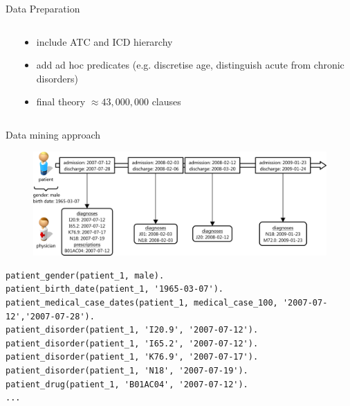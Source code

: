 \message{ !name(presentation.tex)}\documentclass{beamer}
\begin{document}
\begin{frame}{Data Preparation}
\begin{columns}
\begin{column}{.3\textwidth}
\end{column}%
\hfill%
\begin{column}{.66\textwidth}
  \begin{itemize}
  \item include ATC and ICD hierarchy
  \item add ad hoc predicates (e.g. discretise age, distinguish acute from chronic disorders)
  \item final theory $\approx 43,000,000$ clauses
  \end{itemize}
\end{column}%
\end{columns}

\end{frame}

\begin{frame}[fragile]{Data mining approach}
 \begin{minipage}{\textwidth}
\begin{figure}
\includegraphics[width=\textwidth,keepaspectratio]{timeline_final2}
\end{figure}
  \end{minipage}
  \vfill
  \begin{minipage}{\textwidth}
    \centering
{\tiny
\begin{verbatim}
patient_gender(patient_1, male).
patient_birth_date(patient_1, '1965-03-07').
patient_medical_case_dates(patient_1, medical_case_100, '2007-07-12','2007-07-28').
patient_disorder(patient_1, 'I20.9', '2007-07-12').
patient_disorder(patient_1, 'I65.2', '2007-07-12').
patient_disorder(patient_1, 'K76.9', '2007-07-17').
patient_disorder(patient_1, 'N18', '2007-07-19').
patient_drug(patient_1, 'B01AC04', '2007-07-12').
...
\end{verbatim}
}
\end{minipage}
\end{frame}
\end{document}
